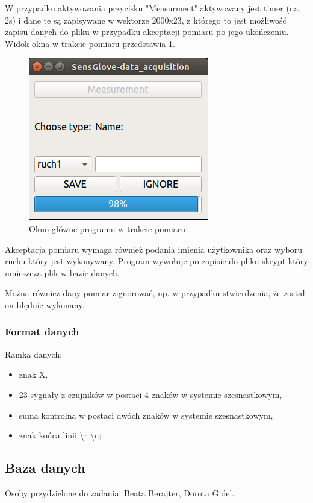\documentclass{article}
\begin{document}
W przypadku aktywowania przycisku "Measurment" aktywowany jest timer (na 2s) i dane te są zapisywane w wektorze 2000x23, z którego to jest możliwość zapisu danych do pliku w przypadku akceptacji pomiaru po jego ukończeniu. Widok okna w trakcie pomiaru przedstawia \ref{rys:oknopomiar}.
\begin{figure}[H]
    \centering
    \includegraphics[scale=0.6]{oknopomiar.png}
    \caption{Okno główne programu w trakcie pomiaru}
    \label{rys:oknopomiar}
\end{figure}

Akceptacja pomiaru wymaga również podania imienia użytkownika oraz wyboru ruchu który jest wykonywany. Program wywołuje po zapisie do pliku skrypt który umieszcza plik w bazie danych.

Można również dany pomiar zignorować, np. w przypadku stwierdzenia, że został on błędnie wykonany.

\subsubsection{Format danych}
Ramka danych:
\begin{itemize}
    \item znak X,
    \item 23 sygnały z czujników w postaci 4 znaków w systemie szesnastkowym,
    \item suma kontrolna w postaci dwóch znaków w systemie szesnastkowym,
    \item znak końca linii \textbackslash r \textbackslash n;
\end{itemize}

\subsection{Baza danych}
Osoby przydzielone do zadania: Beata Berajter, Dorota Gidel.
\end{document}
